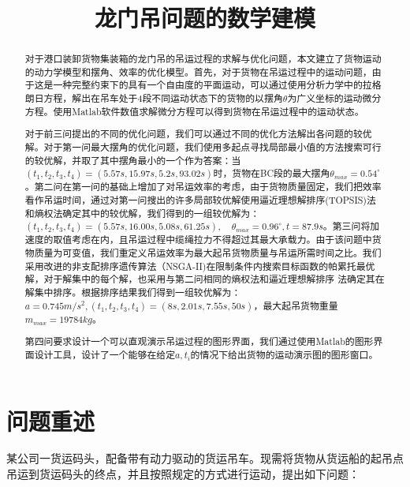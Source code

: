 \documentclass[withoutpreface,bwprint]{cumcmthesis} %
\title{龙门吊问题的数学建模}
\begin{document}
\maketitle
\begin{abstract}
    对于港口装卸货物集装箱的龙门吊的吊运过程的求解与优化问题，本文建立了货物运动的动力学模型和摆角、效率的优化模型。首先，对于货物在吊运过程中的运动问题，由于这是一种完整约束下的具有一个自由度的平面运动，可以通过使用分析力学中的拉格朗日方程，解出在吊车处于4段不同运动状态下的货物的以摆角$\theta$为广义坐标的运动微分方程。使用Matlab软件数值求解微分方程可以得到货物在吊运过程中的运动状态。

    对于前三问提出的不同的优化问题，我们可以通过不同的优化方法解出各问题的较优解。对于第一问最大摆角的优化问题，我们使用多起点寻找局部最小值的方法搜索可行的较优解，并取了其中摆角最小的一个作为答案：当$(t_1,t_2,t_3,t_4)=(5.57s,15.97s,5.2s,93.02s)$时，货物在BC段的最大摆角$\theta_{max}=0.54^{\circ}$。第二问在第一问的基础上增加了对吊运效率的考虑，由于货物质量固定，我们把效率看作吊运时间，通过对第一问搜出的许多局部较优解使用逼近理想解排序(TOPSIS)法和熵权法确定其中的较优解，我们得到的一组较优解为：$(t_1,t_2,t_3,t_4)=(5.57s,16.00s,5.08s,61.25s),\quad \theta_{max}=0.96^{\circ},t=87.9s$。第三问将加速度的取值考虑在内，且吊运过程中缆绳拉力不得超过其最大承载力。由于该问题中货物质量为可变值，我们重定义吊运效率为最大起吊货物质量与吊运所需时间之比。我们采用改进的非支配排序遗传算法（NSGA-II)在限制条件内搜索目标函数的帕累托最优解，对于解集中的每个解，也采用与第二问相同的熵权法和逼近理想解排序
    法确定其在解集中排序。根据排序结果我们得到一组较优解为：$a=0.745m/s^2,(t_1,t_2,t_3,t_4)=(8s,2.01s,7.55s,50s)$，最大起吊货物重量$m_{max}=19784kg$。
    

    第四问要求设计一个可以直观演示吊运过程的图形界面，我们通过使用Matlab的图形界面设计工具，设计了一个能够在给定$a,t_i$的情况下给出货物的运动演示图的图形窗口。

\end{abstract}
\section{问题重述}
某公司一货运码头，配备带有动力驱动的货运吊车。现需将货物从货运船的起吊点吊运到货运码头的终点，并且按照规定的方式进行运动，提出如下问题：
\end{document}
